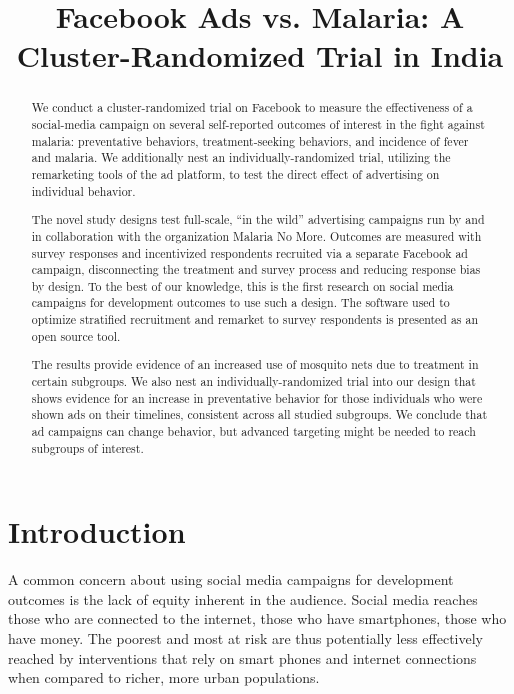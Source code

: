 \documentclass[a4paper,12pt]{article}
\title{Facebook Ads vs. Malaria: A Cluster-Randomized Trial in India}
\begin{document}
\maketitle

\begin{abstract}
We conduct a cluster-randomized trial on Facebook to measure the effectiveness of a social-media campaign on several self-reported outcomes of interest in the fight against malaria: preventative behaviors, treatment-seeking behaviors, and incidence of fever and malaria. We additionally nest an individually-randomized trial, utilizing the remarketing tools of the ad platform, to test the direct effect of advertising on individual behavior.

The novel study designs test full-scale, ``in the wild'' advertising campaigns run by and in collaboration with the organization Malaria No More. Outcomes are measured with survey responses and incentivized respondents recruited via a separate Facebook ad campaign, disconnecting the treatment and survey process and reducing response bias by design. To the best of our knowledge, this is the first research on social media campaigns for development outcomes to use such a design. The software used to optimize stratified recruitment and remarket to survey respondents is presented as an open source tool.

The results provide evidence of an increased use of mosquito nets due to treatment in certain subgroups. We also nest an individually-randomized trial into our design that shows evidence for an increase in preventative behavior for those individuals who were shown ads on their timelines, consistent across all studied subgroups. We conclude that ad campaigns can change behavior, but advanced targeting might be needed to reach subgroups of interest.



\end{abstract}

\clearpage

\section{Introduction}

A common concern about using social media campaigns for development outcomes is the lack of equity inherent in the audience. Social media reaches those who are connected to the internet, those who have smartphones, those who have money. The poorest and most at risk are thus potentially less effectively reached by interventions that rely on smart phones and internet connections when compared to richer, more urban populations.
\end{document}
